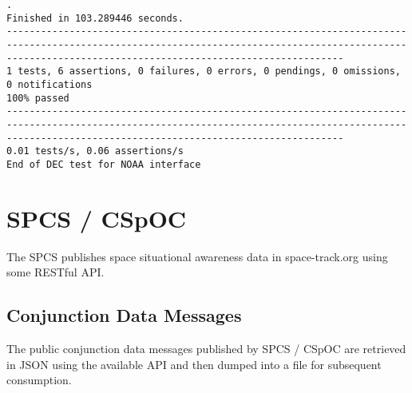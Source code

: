 \documentclass[dec_sum_main.tex]{subfiles}
\begin{document}
\begin{Verbatim}[fontsize=\tiny]
.
Finished in 103.289446 seconds.
-------------------------------------------------------------------------------------------------------------------------------------------------------------------------------------------------------
1 tests, 6 assertions, 0 failures, 0 errors, 0 pendings, 0 omissions, 0 notifications
100% passed
-------------------------------------------------------------------------------------------------------------------------------------------------------------------------------------------------------
0.01 tests/s, 0.06 assertions/s
End of DEC test for NOAA interface		
	\end{Verbatim}


\pagebreak

\section{SPCS / CSpOC}
The SPCS publishes space situational awareness data in space-track.org using some RESTful API.

\subsection{Conjunction Data Messages}
The public conjunction data messages published by SPCS / CSpOC are retrieved in JSON using the available API and then dumped into a file for subsequent consumption. 
\end{document}
